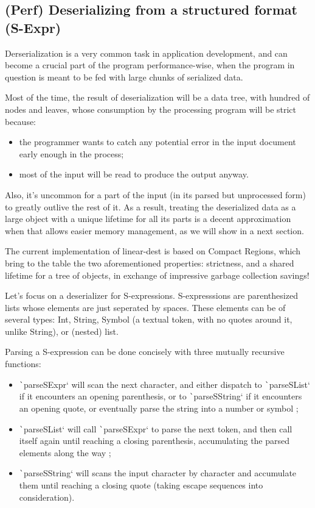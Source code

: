 \documentclass[english]{jflart}
\begin{document}
\subsection{(Perf) Deserializing from a structured format (S-Expr)}

Derserialization is a very common task in application development, and can become a crucial part of the program performance-wise, when the program in question is meant to be fed with large chunks of serialized data.

Most of the time, the result of deserialization will be a data tree, with hundred of nodes and leaves, whose consumption by the processing program will be strict because:
\begin{itemize}
  \item the programmer wants to catch any potential error in the input document early enough in the process;
  \item most of the input will be read to produce the output anyway.
\end{itemize}

Also, it's uncommon for a part of the input (in its parsed but unprocessed form) to greatly outlive the rest of it. As a result, treating the deserialized data as a large object with a unique lifetime for all its parts is a decent  approximation when that allows easier memory management, as we will show in a next section.

The current implementation of linear-dest is based on Compact Regions, which bring to the table the two aforementioned properties: strictness, and a shared lifetime for a tree of objects, in exchange of impressive garbage collection savings!

Let's focus on a deserializer for S-expressions. S-expresssions are parenthesized lists whose elements are just seperated by spaces. These elements can be of several types: Int, String, Symbol (a textual token, with no quotes around it, unlike String), or (nested) list.

Parsing a S-expression can be done concisely with three mutually recursive functions:
\begin{itemize}
  \item \texttt`parseSExpr` will scan the next character, and either dispatch to \texttt`parseSList` if it encounters an opening parenthesis, or to \texttt`parseSString` if it encounters an opening quote, or eventually parse the string into a number or symbol ;
  \item \texttt`parseSList` will call \texttt`parseSExpr` to parse the next token, and then call itself again until reaching a closing parenthesis, accumulating the parsed elements along the way ;
  \item \texttt`parseSString` will scans the input character by character and accumulate them until reaching a closing quote (taking escape sequences into consideration).
\end{itemize}
\end{document}
